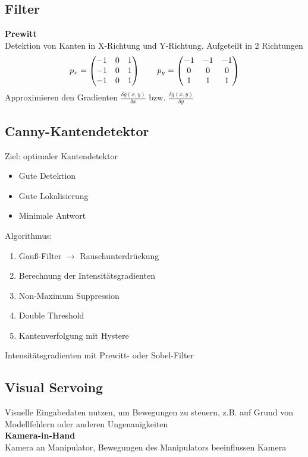 \subsection{Filter}
\textbf{Prewitt}\\
Detektion von Kanten in X-Richtung und Y-Richtung. Aufgeteilt in 2 Richtungen
\[p_x = \begin{pmatrix}-1 & 0 & 1\\-1 & 0 & 1\\ -1 & 0 & 1\\\end{pmatrix} \qquad p_y = \begin{pmatrix}-1 & -1 & -1\\ 0 & 0 & 0\\ 1& 1 & 1\\\end{pmatrix}\]
Approximieren den Gradienten \(\frac{\delta g(x, y)}{\delta x}\) bzw. \(\frac{\delta g(x, y)}{\delta y}\)
\subsection{Canny-Kantendetektor}
Ziel: optimaler Kantendetektor
\begin{itemize}
\item Gute Detektion
\item Gute Lokalisierung
\item Minimale Antwort
\end{itemize}

Algorithmus:
\begin{enumerate}
\item Gauß-Filter \(\rightarrow\) Rauschunterdrückung
\item Berechnung der Intensitätsgradienten
\item Non-Maximum Suppression
\item Double Threshold
\item Kantenverfolgung mit Hystere
\end{enumerate}

Intensitätsgradienten mit Prewitt- oder Sobel-Filter

\subsection{Visual Servoing}
Visuelle Eingabedaten nutzen, um Bewegungen zu steuern, z.B. auf Grund von Modellfehlern oder anderen Ungenauigkeiten\\

\textbf{Kamera-in-Hand}\\
Kamera an Manipulator, Bewegungen des Manipulators beeinflussen Kamera\\

